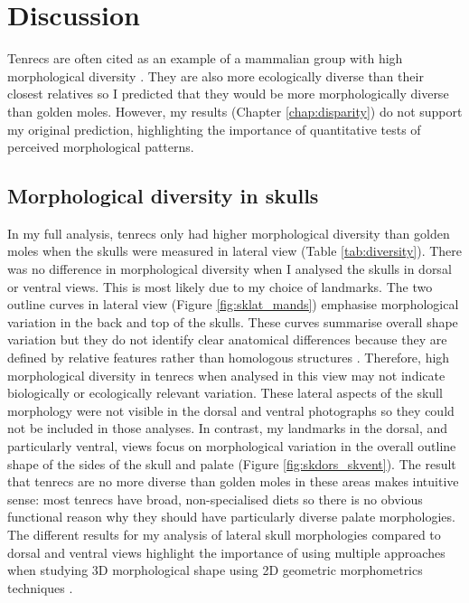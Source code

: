 \chapter{Discussion}
\label{chap:discussion}


	Tenrecs are often cited as an example of a mammalian group with high morphological diversity \citep{Olson2013, Soarimalala2011, Eisenberg1969}. They are also more ecologically diverse than their closest relatives \citep{Soarimalala2011, Bronner1995} so I predicted that they would be more morphologically diverse than golden moles. However, my results (Chapter \ref{chap:disparity}) do not support my original prediction, highlighting the importance of quantitative tests of perceived morphological patterns.

\section{Morphological diversity in skulls}


	In my full analysis, tenrecs only had higher morphological diversity than golden moles when the skulls were measured in lateral view (Table \ref{tab:diversity}). There was no difference in morphological diversity when I analysed the skulls in dorsal or ventral views. This is most likely due to my choice of landmarks. The two outline curves in lateral view (Figure \ref{fig:sklat_mands}) emphasise morphological variation in the back and top of the skulls. These curves summarise overall shape variation but they do not identify clear anatomical differences because they are defined by relative features rather than homologous structures \citep{Zelditch2012}. Therefore, high morphological diversity in tenrecs when analysed in this view may not indicate biologically or ecologically relevant variation.	
	These lateral aspects of the skull morphology were not visible in the dorsal and ventral photographs so they could not be included in those analyses. In contrast, my landmarks in the dorsal, and particularly ventral, views focus on morphological variation in the overall outline shape of the sides of the skull and palate (Figure \ref{fig:skdors_skvent}). The result that tenrecs are no more diverse than golden moles in these areas makes intuitive sense: most tenrecs have broad, non-specialised diets \citep{Olson2013} so there is no obvious functional reason why they should have particularly diverse palate morphologies.
	The different results for my analysis of lateral skull morphologies compared to dorsal and ventral views highlight the importance of using multiple approaches when studying 3D morphological shape using 2D geometric morphometrics techniques \citep{Arnqvist1998}.


